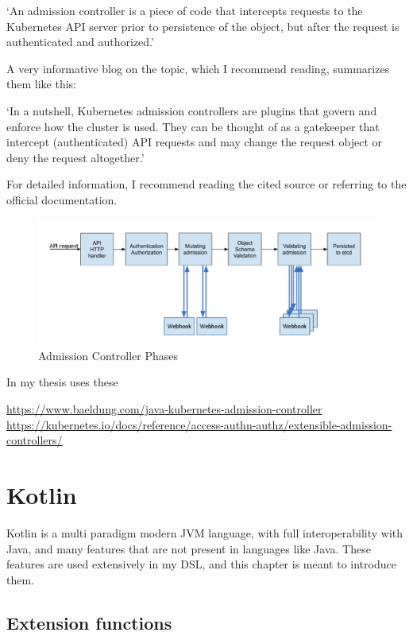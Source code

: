 `An admission controller is a piece of code that intercepts requests to the Kubernetes API server prior to persistence of the object, but after the request is authenticated and authorized.'

A very informative blog\cite{K8sAdmissionBlog} on the topic, which I recommend reading, summarizes them like this:

`In a nutshell, Kubernetes admission controllers are plugins that govern and enforce how the cluster is used. They can be thought of as a gatekeeper that intercept (authenticated) API requests and may change the request object or deny the request altogether.' 

For detailed information, I recommend reading the cited\cite{K8sAdmissionBlog} source or referring to the official documentation\cite{K8sAdmissionOfficial}.

\begin{figure}[h]
    \centering
    \includegraphics[width=130mm, keepaspectratio]{content/10_prerequisites/dynadm.png}
    \caption{Admission Controller Phases\cite{K8sAdmissionBlog}}
    \label{fig:dynadm}
\end{figure}

In my thesis uses these 

\url{https://www.baeldung.com/java-kubernetes-admission-controller}
\url{https://kubernetes.io/docs/reference/access-authn-authz/extensible-admission-controllers/}



\section{Kotlin}

Kotlin is a multi paradigm modern JVM language, with full interoperability with Java, and many features that are not present in languages like Java. These features are used extensively in my DSL, and this chapter is meant to introduce them.

\subsection{Extension functions}
\label{sec:extension}

